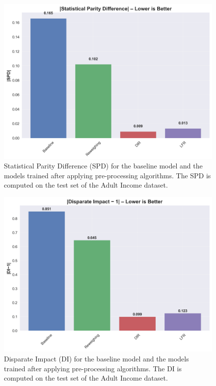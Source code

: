 \documentclass[12pt,a4paper,openright,twoside]{book}
\begin{document}
\begin{figure}
    \centering
    \includegraphics[width=\textwidth]{figures/preprocessing_results/preprocessing_spd_comparison.png}
    \caption{Statistical Parity Difference (SPD) for the baseline model and the models trained after applying pre-processing algorithms. The SPD is computed on the test set of the Adult Income dataset.}
    \label{fig:preprocessing_results}
\end{figure}

\begin{figure}
    \centering
    \includegraphics[width=\textwidth]{figures/preprocessing_results/preprocessing_di_comparison.png}
    \caption{Disparate Impact (DI) for the baseline model and the models trained after applying pre-processing algorithms. The DI is computed on the test set of the Adult Income dataset.}
    \label{fig:preprocessing_results_di}
\end{figure}
\end{document}

